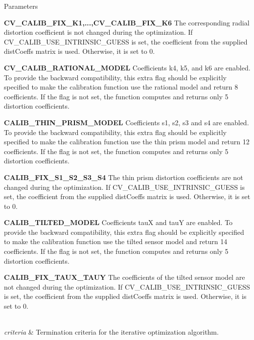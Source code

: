 \begin{DoxyParams}{Parameters}
$$\begin{DoxyItemize}
\item {\bfseries C\+V\+\_\+\+C\+A\+L\+I\+B\+\_\+\+F\+I\+X\+\_\+\+K1,...,C\+V\+\_\+\+C\+A\+L\+I\+B\+\_\+\+F\+I\+X\+\_\+\+K6} The corresponding radial distortion coefficient is not changed during the optimization. If C\+V\+\_\+\+C\+A\+L\+I\+B\+\_\+\+U\+S\+E\+\_\+\+I\+N\+T\+R\+I\+N\+S\+I\+C\+\_\+\+G\+U\+E\+SS is set, the coefficient from the supplied dist\+Coeffs matrix is used. Otherwise, it is set to 0.
\item {\bfseries C\+V\+\_\+\+C\+A\+L\+I\+B\+\_\+\+R\+A\+T\+I\+O\+N\+A\+L\+\_\+\+M\+O\+D\+EL} Coefficients k4, k5, and k6 are enabled. To provide the backward compatibility, this extra flag should be explicitly specified to make the calibration function use the rational model and return 8 coefficients. If the flag is not set, the function computes and returns only 5 distortion coefficients.
\item {\bfseries C\+A\+L\+I\+B\+\_\+\+T\+H\+I\+N\+\_\+\+P\+R\+I\+S\+M\+\_\+\+M\+O\+D\+EL} Coefficients s1, s2, s3 and s4 are enabled. To provide the backward compatibility, this extra flag should be explicitly specified to make the calibration function use the thin prism model and return 12 coefficients. If the flag is not set, the function computes and returns only 5 distortion coefficients.
\item {\bfseries C\+A\+L\+I\+B\+\_\+\+F\+I\+X\+\_\+\+S1\+\_\+\+S2\+\_\+\+S3\+\_\+\+S4} The thin prism distortion coefficients are not changed during the optimization. If C\+V\+\_\+\+C\+A\+L\+I\+B\+\_\+\+U\+S\+E\+\_\+\+I\+N\+T\+R\+I\+N\+S\+I\+C\+\_\+\+G\+U\+E\+SS is set, the coefficient from the supplied dist\+Coeffs matrix is used. Otherwise, it is set to 0.
\item {\bfseries C\+A\+L\+I\+B\+\_\+\+T\+I\+L\+T\+E\+D\+\_\+\+M\+O\+D\+EL} Coefficients tauX and tauY are enabled. To provide the backward compatibility, this extra flag should be explicitly specified to make the calibration function use the tilted sensor model and return 14 coefficients. If the flag is not set, the function computes and returns only 5 distortion coefficients.
\item {\bfseries C\+A\+L\+I\+B\+\_\+\+F\+I\+X\+\_\+\+T\+A\+U\+X\+\_\+\+T\+A\+UY} The coefficients of the tilted sensor model are not changed during the optimization. If C\+V\+\_\+\+C\+A\+L\+I\+B\+\_\+\+U\+S\+E\+\_\+\+I\+N\+T\+R\+I\+N\+S\+I\+C\+\_\+\+G\+U\+E\+SS is set, the coefficient from the supplied dist\+Coeffs matrix is used. Otherwise, it is set to 0. 
\end{DoxyItemize}\\
\hline
{\em criteria} & Termination criteria for the iterative optimization algorithm. \\
\hline
\end{DoxyParams}
